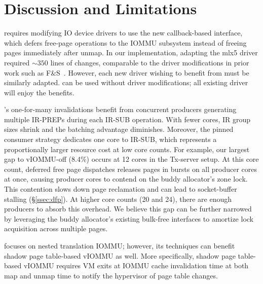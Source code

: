 \section{Discussion and Limitations}

\brand requires modifying IO device drivers to use the new callback-based  interface,
    which defers free-page operations to the IOMMU subsystem
    instead of freeing pages immediately after unmap.
In our implementation, adapting the mlx5 driver required ${\sim}350$ lines of changes,
    comparable to the driver modifications in prior work such as F\&S~\cite{Rubin2024FastSafe}.
However, each new driver wishing to benefit from \brand must be similarly adapted.
\optOne{} can be used without driver modifications; all existing driver will enjoy the benefits.

\brand's one-for-many invalidations benefit from concurrent producers generating
    multiple IR-PREPs during each IR-SUB operation.
With fewer cores, IR group sizes shrink and the batching advantage diminishes.
Moreover, the pinned consumer strategy dedicates one core to IR-SUB,
    which represents a proportionally larger resource cost at low core counts.
For example, our largest gap to vIOMMU-off (8.4\%) occurs at 12 cores in the Tx-server setup.
At this core count, deferred free page dispatches releases pages in bursts
    on all producer cores at once,
    causing producer cores to contend on the buddy allocator's zone lock.
This contention slows down page reclamation and can lead to socket-buffer stalling (\S\ref{ssec:dfp}).
At higher core counts (20 and 24), there are enough producers to absorb this overhead.
We believe this gap can be further narrowed by leveraging the buddy allocator's
    existing bulk-free interfaces to amortize lock acquisition across multiple pages.

\name{} focuses on nested translation IOMMU;
however, its techniques can benefit shadow page table-based vIOMMU as well.
More specifically, shadow page table-based vIOMMU requires VM exits at IOMMU cache invalidation time at both map and unmap time
to notify the hypervisor of page table changes.

